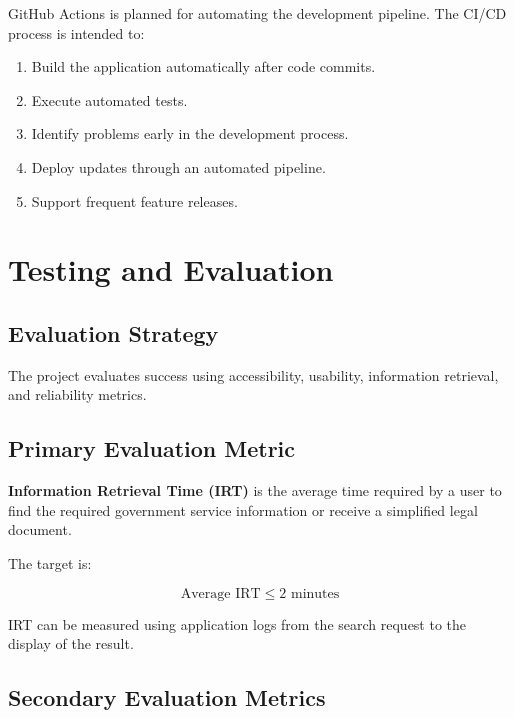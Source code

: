 \documentclass[12pt,a4paper]{report}
\begin{document}
GitHub Actions is planned for automating the development pipeline. The CI/CD process is intended to:

\begin{enumerate}[leftmargin=*]
    \item Build the application automatically after code commits.
    \item Execute automated tests.
    \item Identify problems early in the development process.
    \item Deploy updates through an automated pipeline.
    \item Support frequent feature releases.
\end{enumerate}

\chapter{Testing and Evaluation}

\section{Evaluation Strategy}

The project evaluates success using accessibility, usability, information retrieval, and reliability metrics.

\section{Primary Evaluation Metric}

\textbf{Information Retrieval Time (IRT)} is the average time required by a user to find the required government service information or receive a simplified legal document.

The target is:

\[
\boxed{\text{Average IRT} \leq 2\text{ minutes}}
\]

IRT can be measured using application logs from the search request to the display of the result.

\section{Secondary Evaluation Metrics}
\end{document}
